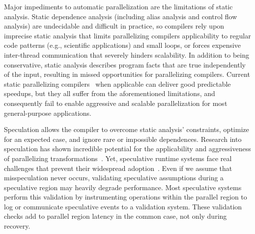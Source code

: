 Major impediments to automatic parallelization are the limitations of static
analysis. Static dependence analysis (including alias analysis and control flow
analysis) are undecidable and difficult in practice, so compilers rely upon
imprecise static analysis that limits parallelizing compilers applicability to
regular code patterns (e.g., scientific applications) and small loops, or forces
expensive inter-thread communication that severely hinders scalability.
%
In addition to being conservative, static analysis describes program facts that
are true independently of the input, resulting in missed opportunities for
parallelizing compilers.
Current static parallelizing compilers~\cite{campanoni:2012:iscgo,
raman:2008:iscgo, suif:94:stanford}
when applicable can deliver good
predictable speedups, but they all suffer from the aforementioned
limitations, and consequently fail to enable aggressive and scalable
parallelization for most general-purpose applications.

Speculation allows the compiler to overcome static analysis' constraints,
optimize for an expected
case, and ignore rare or impossible dependences.  Research into speculation has
shown incredible potential for the applicability and aggressiveness of
parallelizing transformations~\cite{zhong:08:hpca, johnson:12:pldi:short}.
%
Yet, speculative runtime systems face real challenges that prevent their
widespread adoption~\cite{cascaval:08:stmtoy:short}.
Even if we assume
that misspeculation never occurs, validating speculative assumptions during
a speculative region may heavily degrade performance.
%
Most speculative systems perform this validation by instrumenting operations
within the parallel region to log or communicate speculative events to a
validation system.  These validation checks add to parallel region latency in
the common case, not only during recovery.

